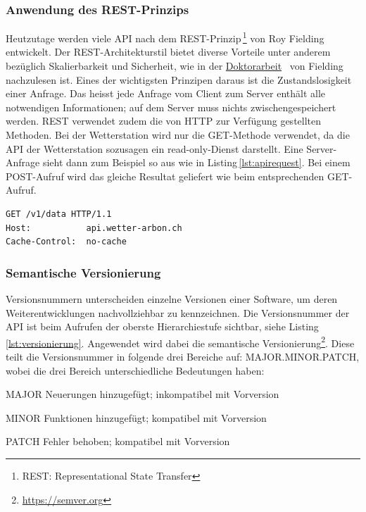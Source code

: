 

\subsubsection{Anwendung des REST-Prinzips}
Heutzutage werden viele API nach dem REST-Prinzip\,\footnote{REST: Representational State Transfer} von Roy Fielding entwickelt. Der REST-Architekturstil bietet diverse Vorteile unter anderem bezüglich Skalierbarkeit und Sicherheit, wie in der \href{https://www.ics.uci.edu/~fielding/pubs/dissertation/top.htm}{Doktorarbeit}~\cite{Fielding:2000:ASD:932295} von Fielding nachzulesen ist. Eines der wichtigsten Prinzipen daraus ist die Zustandslosigkeit einer Anfrage. Das heisst jede Anfrage vom Client zum Server enthält alle notwendigen Informationen; auf dem Server muss nichts zwischengespeichert werden. REST verwendet zudem die von HTTP zur Verfügung gestellten Methoden\cite{LornaJaneMitchell2013oreilly}. Bei der Wetterstation wird nur die GET-Methode verwendet, da die API der Wetterstation sozusagen ein read-only-Dienst darstellt. Eine Server-Anfrage sieht dann zum Beispiel so aus wie in Listing\,\ref{lst:apirequest}. Bei einem POST-Aufruf wird das gleiche Resultat geliefert wie beim entsprechenden GET-Aufruf. 


\vspace{3mm}
\begin{lstlisting}[label=lst:apirequest,caption=RESTful-Serveranfrage, language=HTML5, style=php]
GET /v1/data HTTP/1.1
Host:           api.wetter-arbon.ch
Cache-Control:  no-cache
\end{lstlisting}
\vspace{3mm}


\subsubsection{Semantische Versionierung}
Versionsnummern unterscheiden einzelne Versionen einer Software, um deren Weiterentwicklungen nachvollziehbar zu kennzeichnen. Die Versionsnummer der API ist beim Aufrufen der oberste Hierarchiestufe sichtbar, siehe Listing\,\ref{lst:versionierung}. Angewendet wird dabei die semantische Versionierung\footnote{\url{https://semver.org}}. Diese teilt die Versionsnummer in folgende drei Bereiche auf: MAJOR.MINOR.PATCH, wobei die drei Bereich unterschiedliche Bedeutungen haben:

\begin{description*}
  \item[MAJOR] Neuerungen hinzugefügt; inkompatibel mit Vorversion
  \item[MINOR] Funktionen hinzugefügt; kompatibel mit Vorversion
  \item[PATCH] Fehler behoben; kompatibel mit Vorversion
\end{description*}

